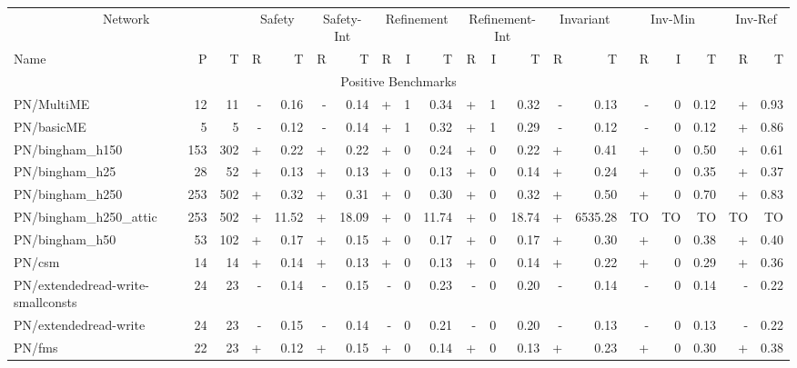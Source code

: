 \documentclass{article}
\begin{document}
\begin{table}[h]
\begin{center}
  \begin{tabular}{ | l | r | r | *{17}{ r | } } %
    \hline
           \multicolumn{3}{|c|}{Network}
         & \multicolumn{2}{|c|}{Safety}
         & \multicolumn{2}{|c|}{Safety-Int}
         & \multicolumn{3}{|c|}{Refinement}
         & \multicolumn{3}{|c|}{Refinement-Int}
         & \multicolumn{2}{|c|}{Invariant}
         & \multicolumn{3}{|c|}{Inv-Min}
         & \multicolumn{2}{|c|}{Inv-Ref} \\
    Name & P & T
        & R & T
        & R & T
        & R & I & T
        & R & I & T
        & R & T
        & R & I & T
        & R & T \\
    \hline
        \multicolumn{20}{|c|}{Positive Benchmarks} \\
    \hline
PN/MultiME & 12 & 11 & - & 0.16 & - & 0.14 & + & 1 & 0.34 & + & 1 & 0.32 & - & 0.13 & - & 0 & 0.12 & + & 0.93 \\
PN/basicME & 5 & 5 & - & 0.12 & - & 0.14 & + & 1 & 0.32 & + & 1 & 0.29 & - & 0.12 & - & 0 & 0.12 & + & 0.86 \\
PN/bingham\_h150 & 153 & 302 & + & 0.22 & + & 0.22 & + & 0 & 0.24 & + & 0 & 0.22 & + & 0.41 & + & 0 & 0.50 & + & 0.61 \\
PN/bingham\_h25 & 28 & 52 & + & 0.13 & + & 0.13 & + & 0 & 0.13 & + & 0 & 0.14 & + & 0.24 & + & 0 & 0.35 & + & 0.37 \\
PN/bingham\_h250 & 253 & 502 & + & 0.32 & + & 0.31 & + & 0 & 0.30 & + & 0 & 0.32 & + & 0.50 & + & 0 & 0.70 & + & 0.83 \\
PN/bingham\_h250\_attic \footnotemark[1] & 253 & 502 & + & 11.52 & + & 18.09 & + & 0 & 11.74 & + & 0 & 18.74 & + & 6535.28 & TO & TO & TO & TO & TO \\
PN/bingham\_h50 & 53 & 102 & + & 0.17 & + & 0.15 & + & 0 & 0.17 & + & 0 & 0.17 & + & 0.30 & + & 0 & 0.38 & + & 0.40 \\
PN/csm & 14 & 14 & + & 0.14 & + & 0.13 & + & 0 & 0.13 & + & 0 & 0.14 & + & 0.22 & + & 0 & 0.29 & + & 0.36 \\
PN/extendedread-write-smallconsts & 24 & 23 & - & 0.14 & - & 0.15 & - & 0 & 0.23 & - & 0 & 0.20 & - & 0.14 & - & 0 & 0.14 & - & 0.22 \\
PN/extendedread-write & 24 & 23 & - & 0.15 & - & 0.14 & - & 0 & 0.21 & - & 0 & 0.20 & - & 0.13 & - & 0 & 0.13 & - & 0.22 \\
PN/fms & 22 & 23 & + & 0.12 & + & 0.15 & + & 0 & 0.14 & + & 0 & 0.13 & + & 0.23 & + & 0 & 0.30 & + & 0.38 \\

\end{tabular}
\end{center}
\end{table}
\end{document}
